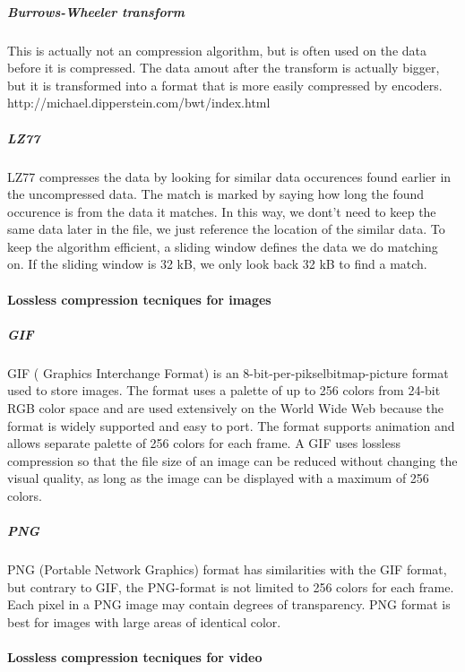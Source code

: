 \subparagraph{Burrows-Wheeler transform } \hfill
\newline
This is actually not an compression algorithm, but is often used on the data before it is compressed. The data amout after the transform is actually bigger, but it is transformed into a format that is more easily compressed by encoders. http://michael.dipperstein.com/bwt/index.html
\cite{bib:burrowsWheelerTransform}

\subparagraph{LZ77} \hfill
\newline
LZ77 compresses the data by looking for similar data occurences found earlier in the uncompressed data. The match is marked by saying how long the found occurence is from the data it matches. In this way, we dont't need to keep the same data later in the file, we just reference the location of the similar data. To keep the algorithm efficient, a sliding window defines the data we do matching on. If the sliding window is 32 kB, we only look back 32 kB to find a match.
\cite{bib:LZ77}

\newpage

\paragraph{Lossless compression tecniques for images}
\subparagraph{GIF} \hfill
\newline
GIF ( Graphics Interchange Format) is an 8-bit-per-pikselbitmap-picture format used to store images. The format uses a palette of up to 256 colors from 24-bit RGB color space and are used extensively on the World Wide Web because the format is widely supported and easy to port. The format supports animation and allows separate palette of 256 colors for each frame. A GIF uses lossless compression so that the file size of an image can be reduced without changing the visual quality, as long as the image can be displayed with a maximum of 256 colors. \cite{bib:GIF} \cite{bib:gifSicle}

\subparagraph{PNG} \hfill
\newline
PNG (Portable Network Graphics) format has similarities with the GIF format, but contrary to GIF, the PNG-format is not limited to 256 colors for each frame. Each pixel in a PNG image may contain degrees of transparency. PNG format is best for images with large areas of identical color. \cite{bib:PNG}

\paragraph{Lossless compression tecniques for video}

